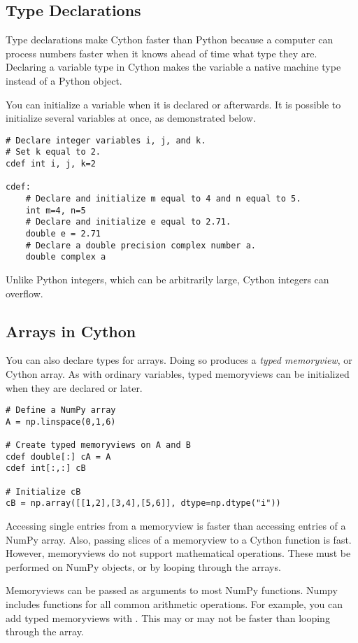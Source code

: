 \subsection*{Type Declarations}
Type declarations make Cython faster than Python because a computer can process numbers faster when it knows ahead of time what type they are.
Declaring a variable type in Cython makes the variable a native machine type instead of a Python object.

You can initialize a variable when it is declared or afterwards.
It is possible to initialize several variables at once, as demonstrated below.

\begin{lstlisting}
# Declare integer variables i, j, and k.
# Set k equal to 2.
cdef int i, j, k=2

cdef:
    # Declare and initialize m equal to 4 and n equal to 5.
    int m=4, n=5
    # Declare and initialize e equal to 2.71.
    double e = 2.71
    # Declare a double precision complex number a.
    double complex a
\end{lstlisting}

\begin{warn}
Unlike Python integers, which can be arbitrarily large, Cython integers can overflow.
\end{warn} 

\subsection*{Arrays in Cython}
You can also declare types for arrays.
Doing so produces a \emph{typed memoryview}, or Cython array.
As with ordinary variables, typed memoryviews can be initialized when they are declared or later.
\begin{lstlisting}
# Define a NumPy array
A = np.linspace(0,1,6)

# Create typed memoryviews on A and B
cdef double[:] cA = A
cdef int[:,:] cB

# Initialize cB
cB = np.array([[1,2],[3,4],[5,6]], dtype=np.dtype("i"))
\end{lstlisting}

Accessing single entries from a memoryview is faster than accessing entries of a NumPy array.
Also, passing slices of a memoryview to a Cython function is fast.
However, memoryviews do not support mathematical operations.
These must be performed on NumPy objects, or by looping through the arrays.

\begin{info}
Memoryviews can be passed as arguments to most NumPy functions.
Numpy includes functions for all common arithmetic operations.
For example, you can add typed memoryviews with .
This may or may not be faster than looping through the array.
\end{info}

